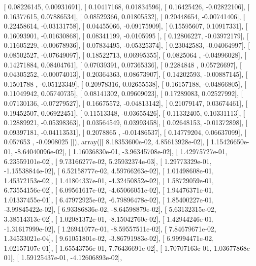 \documentclass{article}
\begin{document}
       [ 0.08226145,  0.00931691],
       [ 0.10417168,  0.01834596],
       [ 0.16425426, -0.02822106],
       [ 0.16377615,  0.07886534],
       [ 0.08529366,  0.01805532],
       [ 0.20448654, -0.00741406],
       [ 0.22458614, -0.03131758],
       [ 0.04455066, -0.09175909],
       [ 0.15595607,  0.10917331],
       [ 0.16093901, -0.01630868],
       [ 0.08341199, -0.0105995 ],
       [ 0.12806227, -0.03972179],
       [ 0.11605229, -0.00678936],
       [ 0.07834495, -0.05325374],
       [ 0.23042583, -0.04064997],
       [ 0.08502527, -0.07649097],
       [ 0.18522713,  0.06995355],
       [ 0.0825064 , -0.04996028],
       [ 0.14271884,  0.08404761],
       [ 0.07039391,  0.07365336],
       [ 0.2284848 ,  0.05726697],
       [ 0.04305252, -0.00074013],
       [ 0.20364363,  0.08673907],
       [ 0.14202593, -0.00887145],
       [ 0.1501788 , -0.05123349],
       [ 0.20978316,  0.02655538],
       [ 0.16157188, -0.04866805],
       [ 0.11049942,  0.05740735],
       [ 0.08141302,  0.09609023],
       [ 0.17289083,  0.02527992],
       [ 0.07130136, -0.07279527],
       [ 0.16675572, -0.04813142],
       [ 0.21079147,  0.03674461],
       [ 0.19452507,  0.06922451],
       [ 0.11513348, -0.03655426],
       [ 0.11332405,  0.10331113],
       [ 0.12889921, -0.05398363],
       [ 0.03564549,  0.03993458],
       [ 0.02648153, -0.01372898],
       [ 0.09397181, -0.04113531],
       [ 0.2078865 , -0.01486537],
       [ 0.14779204,  0.06637099],
       [ 0.057653  , -0.0908025 ]]), array([[  8.18353600e-02,   4.85613928e-02],
       [  1.15426650e-01,  -8.64040096e-02],
       [  1.16036830e-01,  -3.96345708e-02],
       [  1.42975727e-01,   6.23559101e-02],
       [  9.73166277e-02,   5.25932374e-03],
       [  1.29773329e-01,  -1.15538844e-02],
       [  6.52158777e-02,   4.59766263e-02],
       [  1.01498608e-01,   1.45372153e-02],
       [  1.41804337e-01,  -4.32450852e-02],
       [  1.58729059e-01,   6.73554156e-02],
       [  6.09561617e-02,  -4.65066051e-02],
       [  1.94476371e-01,   1.01337455e-01],
       [  6.47972925e-02,  -6.79896478e-02],
       [  1.85400227e-01,  -3.99845422e-02],
       [  6.93386836e-02,  -8.64598879e-02],
       [  5.63132315e-02,   3.38514313e-02],
       [  1.02081372e-01,  -8.15042760e-02],
       [  1.42944246e-01,  -1.31617999e-02],
       [  1.26941077e-01,  -8.59557511e-02],
       [  7.84679671e-02,   1.34533021e-04],
       [  9.61051801e-02,  -3.86791983e-02],
       [  6.99994471e-02,   1.02157107e-01],
       [  1.65543756e-01,   7.76436691e-02],
       [  1.70707163e-01,   1.03677868e-01],
       [  1.59125437e-01,  -4.12606893e-02],
\end{document}
